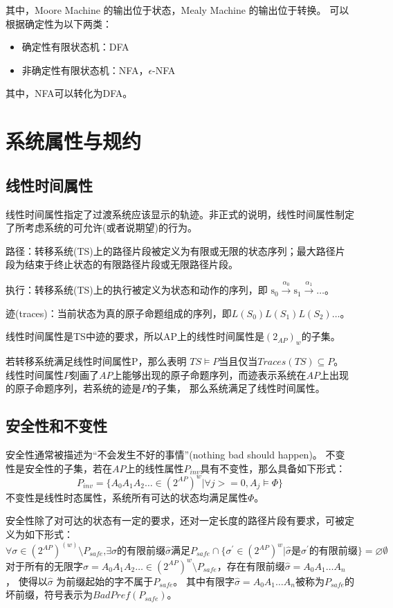 其中，Moore Machine 的输出位于状态，Mealy Machine 的输出位于转换。
可以根据确定性为以下两类：
\begin{itemize}
    \item 确定性有限状态机：DFA
    \item 非确定性有限状态机：NFA，$\epsilon$-NFA
\end{itemize}

其中，NFA可以转化为DFA。

\section{系统属性与规约}
\subsection{线性时间属性}
线性时间属性指定了过渡系统应该显示的轨迹。非正式的说明，线性时间属性制定了所考虑系统的可允许(或者说期望)的行为。

路径：转移系统(TS)上的路径片段被定义为有限或无限的状态序列；最大路径片段为结束于终止状态的有限路径片段或无限路径片段。

执行：转移系统(TS)上的执行被定义为状态和动作的序列，即
$\mathrm{s}_0 \stackrel{\alpha_0}{\longrightarrow} \mathrm{s}_1 \stackrel{\alpha_1}{\longrightarrow} \ldots$。

迹(traces)：当前状态为真的原子命题组成的序列，即$L(S_0)L(S_1)L(S_2)\dots$。

线性时间属性是TS中迹的要求，所以AP上的线性时间属性是$(2_{AP})_w$的子集。

若转移系统满足线性时间属性$\mathrm{P}$，那么表明 $ TS \models P \text{当且仅当} Traces(TS) \subseteq  P $。
线性时间属性$P$刻画了$AP$上能够出现的原子命题序列，而迹表示系统在$AP$上出现的原子命题序列，若系统的迹是$P$的子集，
那么系统满足了线性时间属性。
\subsection{安全性和不变性}
安全性通常被描述为“不会发生不好的事情”(nothing bad should happen)。
不变性是安全性的子集，若在$AP$上的线性属性$P_{inv}$具有不变性，那么具备如下形式：
\begin{equation}
    P_{inv} = \{A_{0}A_{1}A_{2}\ldots \in(2^{AP})^{w}\vert \forall j>=0, A_{j} \models \Phi \}
\end{equation}
不变性是线性时态属性，系统所有可达的状态均满足属性$\Phi$。

安全性除了对可达的状态有一定的要求，还对一定长度的路径片段有要求，可被定义为如下形式：
\begin{equation}
   \forall \sigma \in (2^{AP})^(w) \setminus  P_{safe} \text{,} \exists \sigma \text{的有限前缀}\hat{\sigma}\text{满足}
    P_{safe} \cap \{ \sigma^{\prime} \in (2^{AP})^w| \hat{\sigma}  \text{是} \sigma^{\prime} 的有限前缀\} = \varnothing \emptyset 
\end{equation}
对于所有的无限字$\sigma = A_{0}A_{1}A_{2}\ldots \in (2^{AP})^{w} \setminus P_{safe}$，存在有限前缀$\hat{\sigma} = A_{0}A_{1} \dots A_{n}$，
使得以$\hat{\sigma}$ 为前缀起始的字不属于$P_{safe}$。
其中有限字$\hat{\sigma} = A_{0}A_{1} \dots A_{n}$被称为$P_{safe}$的坏前缀，符号表示为$BadPref(P_{safe})$。

